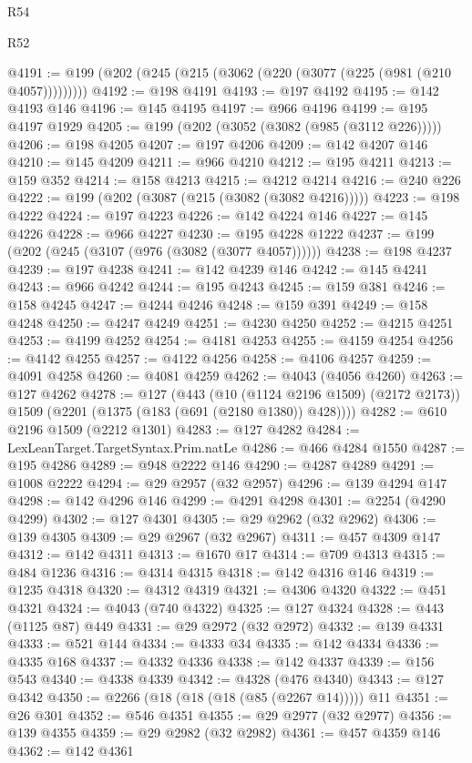\begin{lexlean}{R54}
\begin{lexlean}{R52}
\begin{coremodule}
{{{{{{{{{{{{{{{{{{{{{{{{{{{{{{{{{{{{{{{{{{{{{{{{{{{{{{{{{{{{{{{{{{{{{{{{{{{{{{{{{{{{{{{{{{{{{{{{{{{{{{{{{{{{{{{{{{{{{{{{{{{{{{{{{{{{{{{{{{{{{{{{{{{{{{{{{{{{{{{{{{{{{{{{{{{{{{{{{{{{{{{{{{{{{{{{{{{{{{@4191 := @199 (@202 (@245 (@215 (@3062 (@220 (@3077 (@225 (@981 (@210 @4057)))))))))
@4192 := @198 @4191
@4193 := @197 @4192
@4195 := @142 @4193 @146
@4196 := @145 @4195
@4197 := @966 @4196
@4199 := @195 @4197 @1929
@4205 := @199 (@202 (@3052 (@3082 (@985 (@3112 @226)))))
@4206 := @198 @4205
@4207 := @197 @4206
@4209 := @142 @4207 @146
@4210 := @145 @4209
@4211 := @966 @4210
@4212 := @195 @4211
@4213 := @159 @352
@4214 := @158 @4213
@4215 := @4212 @4214
@4216 := @240 @226
@4222 := @199 (@202 (@3087 (@215 (@3082 (@3082 @4216)))))
@4223 := @198 @4222
@4224 := @197 @4223
@4226 := @142 @4224 @146
@4227 := @145 @4226
@4228 := @966 @4227
@4230 := @195 @4228 @1222
@4237 := @199 (@202 (@245 (@3107 (@976 (@3082 (@3077 @4057))))))
@4238 := @198 @4237
@4239 := @197 @4238
@4241 := @142 @4239 @146
@4242 := @145 @4241
@4243 := @966 @4242
@4244 := @195 @4243
@4245 := @159 @381
@4246 := @158 @4245
@4247 := @4244 @4246
@4248 := @159 @391
@4249 := @158 @4248
@4250 := @4247 @4249
@4251 := @4230 @4250
@4252 := @4215 @4251
@4253 := @4199 @4252
@4254 := @4181 @4253
@4255 := @4159 @4254
@4256 := @4142 @4255
@4257 := @4122 @4256
@4258 := @4106 @4257
@4259 := @4091 @4258
@4260 := @4081 @4259
@4262 := @4043 (@4056 @4260)
@4263 := @127 @4262
@4278 := @127
    (@443
      (@10 (@1124 @2196 @1509) (@2172 @2173))
      @1509
      (@2201 (@1375 (@183 (@691 (@2180 @1380)) @428))))
@4282 := @610 @2196 @1509 (@2212 @1301)
@4283 := @127 @4282
@4284 := LexLeanTarget.TargetSyntax.Prim.natLe
@4286 := @466 @4284 @1550
@4287 := @195 @4286
@4289 := @948 @2222 @146
@4290 := @4287 @4289
@4291 := @1008 @2222
@4294 := @29 @2957 (@32 @2957)
@4296 := @139 @4294 @147
@4298 := @142 @4296 @146
@4299 := @4291 @4298
@4301 := @2254 (@4290 @4299)
@4302 := @127 @4301
@4305 := @29 @2962 (@32 @2962)
@4306 := @139 @4305
@4309 := @29 @2967 (@32 @2967)
@4311 := @457 @4309 @147
@4312 := @142 @4311
@4313 := @1670 @17
@4314 := @709 @4313
@4315 := @484 @1236
@4316 := @4314 @4315
@4318 := @142 @4316 @146
@4319 := @1235 @4318
@4320 := @4312 @4319
@4321 := @4306 @4320
@4322 := @451 @4321
@4324 := @4043 (@740 @4322)
@4325 := @127 @4324
@4328 := @443 (@1125 @87) @449
@4331 := @29 @2972 (@32 @2972)
@4332 := @139 @4331
@4333 := @521 @144
@4334 := @4333 @34
@4335 := @142 @4334
@4336 := @4335 @168
@4337 := @4332 @4336
@4338 := @142 @4337
@4339 := @156 @543
@4340 := @4338 @4339
@4342 := @4328 (@476 @4340)
@4343 := @127 @4342
@4350 := @2266 (@18 (@18 (@18 (@85 (@2267 @14))))) @11
@4351 := @26 @301
@4352 := @546 @4351
@4355 := @29 @2977 (@32 @2977)
@4356 := @139 @4355
@4359 := @29 @2982 (@32 @2982)
@4361 := @457 @4359 @146
@4362 := @142 @4361
}}}}}}}}}}}}}}}}}}}}}}}}}}}}}}}}}}}}}}}}}}}}}}}}}}}}}}}}}}}}}}}}}}}}}}}}}}}}}}}}}}}}}}}}}}}}}}}}}}}}}}}}}}}}}}}}}}}}}}}}}}}}}}}}}}}}}}}}}}}}}}}}}}}}}}}}}}}}}}}}}}}}}}}}}}}}}}}}}}}}}}}}}}}}}}}}}}}}}}
\end{coremodule}
\end{lexlean}
\end{lexlean}
